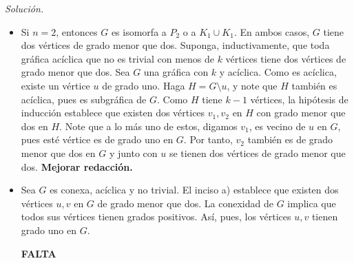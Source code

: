 \documentclass[12pt]{article}
\newenvironment{problem}[2][Problema]{\begin{trivlist}
\item[\hskip \labelsep {\bfseries #1}\hskip \labelsep {\bfseries #2}]}{\end{trivlist}}
\begin{document}
\begin{problem}{2.1.2}

\end{problem}
\textit{Solución.} \begin{itemize}
    \item[a)] Si $n = 2$, entonces $G$ es isomorfa a $P_2$ o a $K_1 \cup K_1$. En ambos casos, $G$ tiene dos vértices de grado menor que dos. Suponga, inductivamente, que toda gráfica acíclica que no es trivial con menos de $k$ vértices tiene dos vértices de grado menor que dos. Sea $G$ una gráfica con $k$ y acíclica. Como es acíclica, existe un vértice $u$ de grado uno.  Haga $H = G \setminus u$, y note que $H$ también es acíclica, pues es subgráfica de $G.$ Como $H$ tiene $k-1$ vértices, la hipótesis de inducción establece que existen dos vértices $v_1, v_2$ en $H$ con grado menor que dos en $H.$ Note que a lo más uno de estos, digamos $v_1$, es vecino de $u$ en $G,$ pues esté vértice es de grado uno en $G.$ Por tanto, $v_2$ también es de grado menor que dos en $G$ y junto con $u$ se tienen dos vértices de grado menor que dos. 
    \textbf{Mejorar redacción.}
    \item Sea $G$ es conexa, acíclica y no trivial. El inciso a) establece que existen dos vértices $u, v$ en $G$ de grado menor que dos. La conexidad de $G$ implica que todos sus vértices tienen grados positivos. Así, pues, los vértices $u,v$ tienen grado uno en $G.$
    
   \textbf{FALTA}
    \end{itemize}


\end{document}
